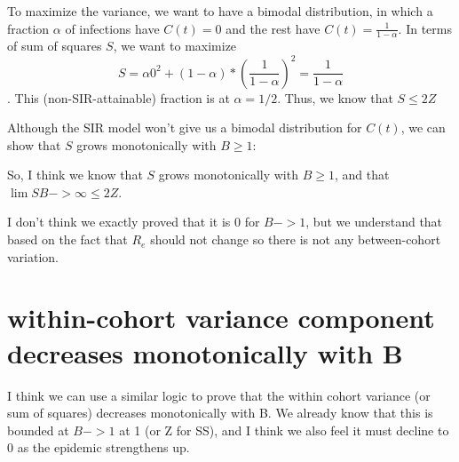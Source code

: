 \documentclass[12pt]{article}
\begin{document}
To maximize the variance, we want to have a bimodal distribution, in which a fraction $\alpha$ of infections have $C(t) = 0$ and the rest have $C(t) = \frac{1}{1-\alpha}$.
In terms of sum of squares $S$, we want to maximize
$$ S = \alpha 0^2 + (1-\alpha)*(\frac{1}{1-\alpha})^2 = \frac{1}{1-\alpha}$$.
This (non-SIR-attainable) fraction is at $\alpha = 1/2$.
Thus, we know that $S \leq 2Z$

Although the SIR model won't give us a bimodal distribution for $C(t)$, we can show that $S$ grows monotonically with $B \geq 1$:

So, I think we know that $S$ grows monotonically with $B \geq 1$, and that $\lim{S} B-> \infty \leq 2Z$.

I don't think we exactly proved that it is 0 for $B->1$, but we understand that based on the fact that $R_e$ should not change so there is not any between-cohort variation.

\section{within-cohort variance component decreases monotonically with B}
I think we can use a similar logic to prove that the within cohort variance (or sum of squares) decreases monotonically with B. We already know that this is bounded at $B ->1$ at 1 (or Z for SS), and I think we also feel it must decline to 0 as the epidemic strengthens up.
\end{document}
